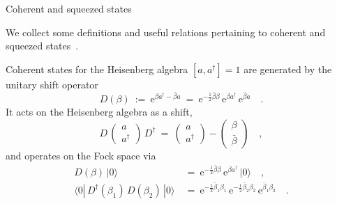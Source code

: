 \documentclass[a4paper,11pt]{article}
\makeatletter
\renewcommand{\section}{\@startsection{section}{1}{0pt}{\medskipamount}
{\medskipamount}{\large\bf}}
\numberwithin{equation}{section}
\def\b{\beta}
\def\e{\mbox{e}}
\newcommand{\adag}{a^{\dagger}}
\makeatother
\begin{document}
\section{Coherent and squeezed states}

\noindent
We collect some definitions and useful relations pertaining to
coherent and squeezed states~\cite{perel}.

Coherent states for the Heisenberg algebra $[a,\adag]=1$ are generated
by the unitary shift operator
\begin{equation}
D(\b)\ :=\ \e^{\b \adag - \bar\b a}\ =\
\e^{-\frac12\bar\b\b}\,\e^{\b \adag}\,\e^{\bar\b a} \quad.
\end{equation}
It acts on the Heisenberg algebra as a shift,
\begin{equation}
D\,\begin{pmatrix} a \\ \adag \end{pmatrix}\,D^\dagger\ =\
\begin{pmatrix} a \\ \adag \end{pmatrix} -
\begin{pmatrix} \b \\ \bar\b \end{pmatrix} \quad,
\end{equation}
and operates on the Fock space via
\begin{align}
D(\b)\,|0\rangle\ &=\ \e^{-\frac12\bar\b\b}\,\e^{\b \adag}\,|0\rangle \quad,\\
\langle0|\,D^\dagger(\b_1)\,D(\b_2)\,|0\rangle \ &=\
\e^{-\frac12\bar\b_1\b_1}\,\e^{-\frac12\bar\b_2\b_2}\,\e^{\bar\b_1\b_2} \quad.
\end{align}
\end{document}
